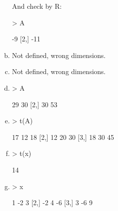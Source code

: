 \documentclass[a4paper,12pt]{scrartcl}
\begin{document}
\begin{enumerate}[a)]
And check by R:
\begin{Schunk}
\begin{Sinput}
> A %*% x
\end{Sinput}
\begin{Soutput}
     [,1]
[1,]   -9
[2,]  -11
\end{Soutput}
\end{Schunk}
\item Not defined, wrong dimensions.
\item Not defined, wrong dimensions.
\item 
\begin{Schunk}
\begin{Sinput}
> A %*% t(A)
\end{Sinput}
\begin{Soutput}
     [,1] [,2]
[1,]   29   30
[2,]   30   53
\end{Soutput}
\end{Schunk}
\item 
\begin{Schunk}
\begin{Sinput}
> t(A) %*% A
\end{Sinput}
\begin{Soutput}
     [,1] [,2] [,3]
[1,]   17   12   18
[2,]   12   20   30
[3,]   18   30   45
\end{Soutput}
\end{Schunk}
\item
\begin{Schunk}
\begin{Sinput}
> t(x)%*%x
\end{Sinput}
\begin{Soutput}
     [,1]
[1,]   14
\end{Soutput}
\end{Schunk}
\item
\begin{Schunk}
\begin{Sinput}
> x%*%t(x)
\end{Sinput}
\begin{Soutput}
     [,1] [,2] [,3]
[1,]    1   -2    3
[2,]   -2    4   -6
[3,]    3   -6    9
\end{Soutput}
\end{Schunk}
\end{enumerate}
\end{document}
